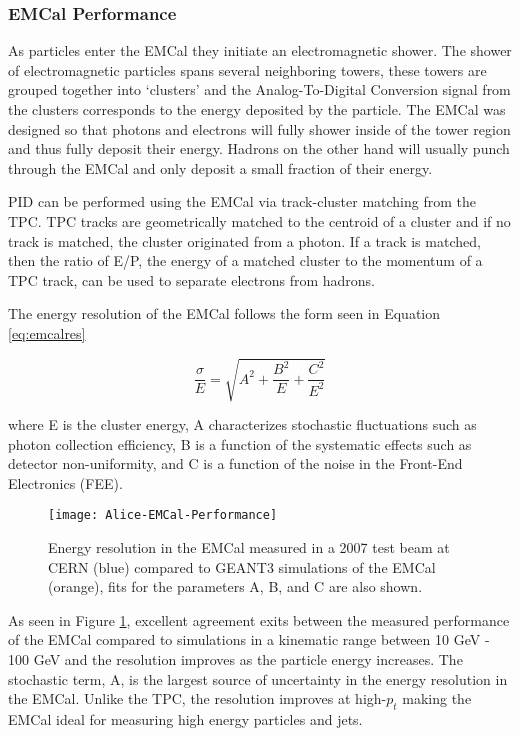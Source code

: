 \subsubsection{EMCal Performance}
As particles enter the EMCal they initiate an electromagnetic shower.  The shower of electromagnetic particles spans several neighboring towers, these towers are grouped together into `clusters' and the Analog-To-Digital Conversion signal from the clusters corresponds to the energy deposited by the particle.  The EMCal was designed so that photons and electrons will fully shower inside of the tower region and thus fully deposit their energy.  Hadrons on the other hand will usually punch through the EMCal and only deposit a small fraction of their energy. 

 PID can be performed using the EMCal via track-cluster matching from the TPC.  TPC tracks are geometrically matched to the centroid of a cluster and if no track is matched, the cluster originated from a photon. If a track is matched, then the ratio of E/P, the energy of a matched cluster to the momentum of a TPC track, can be used to separate electrons from hadrons.

The energy resolution of the EMCal follows the form seen in Equation \ref{eq:emcalres}



\begin{equation}
\frac{\sigma}{E} = \sqrt{ A^{2} + \frac{B^{2}}{E} + \frac{C^{2}}{E^{2}}  }
\label{eq:emcalres}
\end{equation}

\noindent
where E is the cluster energy, A characterizes stochastic fluctuations such as photon collection efficiency, B is a function of the systematic effects such as detector non-uniformity, and C is a function of the noise in the Front-End Electronics (FEE). 

\begin{figure}[h]
\texttt{[image: Alice-EMCal-Performance]}
\centering
\caption{Energy resolution in the EMCal measured in a 2007 test beam at CERN (blue) compared to GEANT3 simulations of the EMCal (orange), fits for the parameters A, B, and C are also shown\cite{Abeysekara:2010ze}.}
\label{fig:EMCalres}
\end{figure}


As seen in Figure \ref{fig:EMCalres}, excellent agreement exits between the measured performance of the EMCal compared to simulations in a kinematic range between 10 GeV - 100 GeV and the resolution improves as the particle energy increases.  The stochastic term, A, is the largest source of uncertainty in the energy resolution in the EMCal.  Unlike the TPC, the resolution improves at high-$p_{t}$ making the EMCal ideal for measuring high energy particles and jets.


